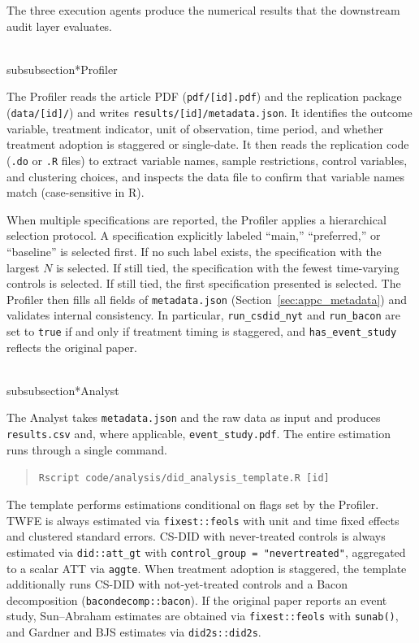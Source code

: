The three execution agents produce the numerical results that the downstream audit layer evaluates.

\\subsubsection*{Profiler}

The Profiler reads the article PDF (\texttt{pdf/[id].pdf}) and the replication package (\texttt{data/[id]/}) and writes \texttt{results/[id]/metadata.json}. It identifies the outcome variable, treatment indicator, unit of observation, time period, and whether treatment adoption is staggered or single-date. It then reads the replication code (\texttt{.do} or \texttt{.R} files) to extract variable names, sample restrictions, control variables, and clustering choices, and inspects the data file to confirm that variable names match (case-sensitive in R).

When multiple specifications are reported, the Profiler applies a hierarchical selection protocol. A specification explicitly labeled ``main,'' ``preferred,'' or ``baseline'' is selected first. If no such label exists, the specification with the largest $N$ is selected. If still tied, the specification with the fewest time-varying controls is selected. If still tied, the first specification presented is selected. The Profiler then fills all fields of \texttt{metadata.json} (Section~\ref{sec:appc_metadata}) and validates internal consistency. In particular, \texttt{run\_csdid\_nyt} and \texttt{run\_bacon} are set to \texttt{true} if and only if treatment timing is staggered, and \texttt{has\_event\_study} reflects the original paper.

\\subsubsection*{Analyst}

The Analyst takes \texttt{metadata.json} and the raw data as input and produces \texttt{results.csv} and, where applicable, \texttt{event\_study.pdf}. The entire estimation runs through a single command.
\begin{quote}
\texttt{Rscript code/analysis/did\_analysis\_template.R [id]}
\end{quote}
The template performs estimations conditional on flags set by the Profiler. TWFE is always estimated via \texttt{fixest::feols} with unit and time fixed effects and clustered standard errors. CS-DID with never-treated controls is always estimated via \texttt{did::att\_gt} with \texttt{control\_group = "nevertreated"}, aggregated to a scalar ATT via \texttt{aggte}. When treatment adoption is staggered, the template additionally runs CS-DID with not-yet-treated controls and a Bacon decomposition (\texttt{bacondecomp::bacon}). If the original paper reports an event study, Sun--Abraham estimates are obtained via \texttt{fixest::feols} with \texttt{sunab()}, and Gardner and BJS estimates via \texttt{did2s::did2s}.

